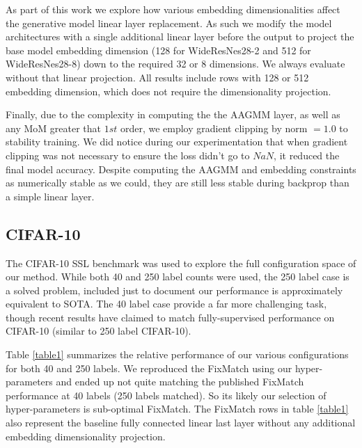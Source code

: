 \documentclass[10pt,twocolumn,letterpaper]{article}
\begin{document}
As part of this work we explore how various embedding dimensionalities affect the generative model linear layer replacement.
As such we modify the model architectures with a single additional linear layer before the output to project the base model embedding dimension (128 for WideResNes28-2 and 512 for WideResNes28-8) down to the required 32 or 8 dimensions.
We always evaluate without that linear projection.
All results include rows with 128 or 512 embedding dimension, which does not require the dimensionality projection.

Finally, due to the complexity in computing the the AAGMM layer, as well as any MoM greater that $1st$ order, we employ gradient clipping by norm $=1.0$ to stability training. 
We did notice during our experimentation that when gradient clipping was not necessary to ensure the loss didn't go to $NaN$, it reduced the final model accuracy.
Despite computing the AAGMM and embedding constraints as numerically stable as we could, they are still less stable during backprop than a simple linear layer.



\subsection{CIFAR-10}

The CIFAR-10 SSL benchmark was used to explore the full configuration space of our method.
While both 40 and 250 label counts were used, the 250 label case is a solved problem, included just to document our performance is approximately equivalent to SOTA. 
The 40 label case provide a far more challenging task, though recent results have claimed to match fully-supervised performance on CIFAR-10 (similar to 250 label CIFAR-10).

Table \ref{table1} summarizes the relative performance of our various configurations for both 40 and 250 labels.
We reproduced the FixMatch \cite{sohn2020fixmatch} using our hyper-parameters and ended up not quite matching the published FixMatch performance at 40 labels (250 labels matched). 
So its likely our selection of hyper-parameters is sub-optimal FixMatch.
The FixMatch rows in table \ref{table1} also represent the baseline fully connected linear last layer without any additional embedding dimensionality projection.
\end{document}
